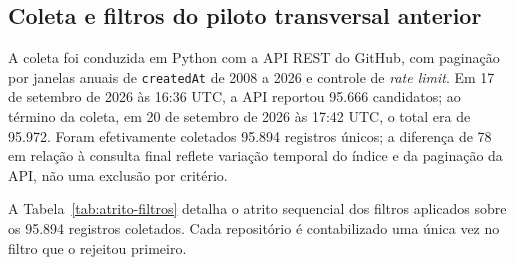 \subsection{Coleta e filtros do piloto transversal anterior}
\label{subsec:res-coleta}

A coleta foi conduzida em Python com a API REST do GitHub, com paginação por janelas anuais de \texttt{createdAt} de 2008 a 2026 e controle de \emph{rate limit}. Em 17 de setembro de 2026 às 16:36 UTC, a API reportou 95.666 candidatos; ao término da coleta, em 20 de setembro de 2026 às 17:42 UTC, o total era de 95.972. Foram efetivamente coletados 95.894 registros únicos; a diferença de 78 em relação à consulta final reflete variação temporal do índice e da paginação da API, não uma exclusão por critério.

A Tabela~\ref{tab:atrito-filtros} detalha o atrito sequencial dos filtros aplicados sobre os 95.894 registros coletados. Cada repositório é contabilizado uma única vez no filtro que o rejeitou primeiro.

